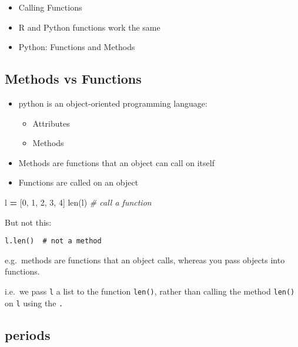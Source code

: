 \documentclass[]{book}
\newenvironment{Shaded}{\begin{snugshade}}{\end{snugshade}}
\newcommand{\BuiltInTok}[1]{#1}
\newcommand{\CommentTok}[1]{\textcolor[rgb]{0.56,0.35,0.01}{\textit{#1}}}
\newcommand{\DecValTok}[1]{\textcolor[rgb]{0.00,0.00,0.81}{#1}}
\newcommand{\NormalTok}[1]{#1}
\newcommand{\OperatorTok}[1]{\textcolor[rgb]{0.81,0.36,0.00}{\textbf{#1}}}
\providecommand{\tightlist}{%
  \setlength{\itemsep}{0pt}\setlength{\parskip}{0pt}}
\theoremstyle{definition}
\theoremstyle{definition}
\theoremstyle{definition}
\theoremstyle{remark}
\begin{document}
\begin{itemize}
\tightlist
\item
  Calling Functions
\item
  R and Python functions work the same
\item
  Python: Functions and Methods
\end{itemize}

\hypertarget{methods-vs-functions}{%
\subsection{Methods vs Functions}\label{methods-vs-functions}}

\begin{itemize}
\tightlist
\item
  python is an object-oriented programming language:

  \begin{itemize}
  \tightlist
  \item
    Attributes
  \item
    Methods
  \end{itemize}
\item
  Methods are functions that an object can call on itself
\item
  Functions are called on an object
\end{itemize}

\begin{Shaded}
\begin{Highlighting}[]
\NormalTok{l }\OperatorTok{=}\NormalTok{ [}\DecValTok{0}\NormalTok{, }\DecValTok{1}\NormalTok{, }\DecValTok{2}\NormalTok{, }\DecValTok{3}\NormalTok{, }\DecValTok{4}\NormalTok{]}
\BuiltInTok{len}\NormalTok{(l)   }\CommentTok{# call a function}
\end{Highlighting}
\end{Shaded}

But not this:

\begin{verbatim}
l.len()  # not a method
\end{verbatim}

e.g.~methods are functions that an object calls, whereas you pass
objects into functions.

i.e.~we pass \texttt{l} a list to the function \texttt{len()}, rather
than calling the method \texttt{len()} on \texttt{l} using the
\texttt{.}

\hypertarget{periods}{%
\subsection{periods}\label{periods}}
\end{document}
